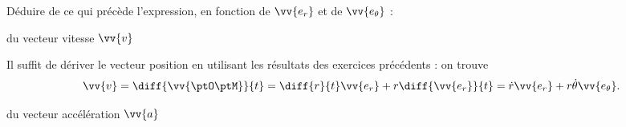
\finEntrainement





\hauteurLargeurCadreReponse		{9mm}{6.5cm}
\initialisationEntrainement


\debutEntrainement

Déduire de ce qui précède l'expression, en fonction de $\vv{e_r}$ et de $\vv{e_\theta}$ :

\begin{enonce}
	 du vecteur vitesse $\vv{v}$ 		
\end{enonce}


\begin{corrigeNewpage}
Il suffit de dériver le vecteur position en utilisant les résultats des exercices précédents : on trouve
\[
\vv{v}=\diff{\vv{\ptO\ptM}}{t}=\diff{r}{t}\vv{e_r}+r\diff{\vv{e_r}}{t}=\dot{r} \vv{e_r} + r\dot{\theta} \vv{e_\theta}.
\]
\end{corrigeNewpage}



\begin{enonce}
	 du vecteur accélération $\vv{a}$ 		
\end{enonce}

